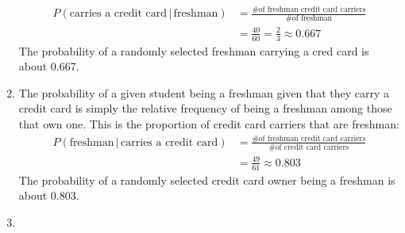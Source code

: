 \documentclass[12pt]{article}
\begin{document}
\begin{enumerate}
\begin{align*}
						P(\text{carries a credit card} \,|\, \text{freshman}) &= \frac{\text{\# of freshman credit card carriers}}{\text{\# of freshman}} \\
							&= \frac{40}{60}
								= \frac{2}{3}
								\approx 0.667
					\end{align*}
					The probability of a randomly selected freshman carrying a cred card is about 0.667.
			\item
				The probability of a given student being a freshman given that they carry a credit card is simply the relative frequency of being a freshman among those that own one. This is the proportion of credit card carriers that are freshman:
					\begin{align*}
						P(\text{freshman} \,|\, \text{carries a credit card}) &= \frac{\text{\# of freshman credit card carriers}}{\text{\# of credit card carriers}} \\
							&= \frac{49}{61}
								\approx 0.803
					\end{align*}
					The probability of a randomly selected credit card owner being a freshman is about 0.803.
			\item
				
		\end{enumerate}
\end{document}
